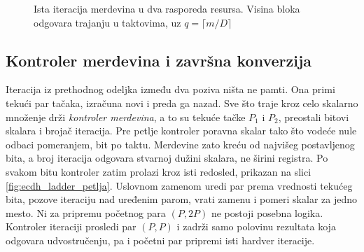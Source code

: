 \begin{figure}[H]
{
}
\caption[Ista iteracija merdevina u dva rasporeda resursa]{Ista iteracija merdevina u dva rasporeda resursa. Visina bloka odgovara trajanju u taktovima, uz $q = \lceil m/D \rceil$}
\label{fig:ecdh_korak_uporedo}
\end{figure}

\subsection{Kontroler merdevina i završna konverzija}
\label{subsec:hw_ecdh_ladder}

Iteracija iz prethodnog odeljka između dva poziva ništa ne pamti. Ona primi tekući par tačaka, izračuna novi i preda ga nazad. Sve što traje kroz celo skalarno množenje drži \textit{kontroler merdevina}, a to su tekuće tačke $P_1$ i $P_2$, preostali bitovi skalara i brojač iteracija.
\smallbreak
Pre petlje kontroler poravna skalar tako što vodeće nule odbaci pomeranjem, bit po taktu. Merdevine zato kreću od najvišeg postavljenog bita, a broj iteracija odgovara stvarnoj dužini skalara, ne širini registra. Po svakom bitu kontroler zatim prolazi kroz isti redosled, prikazan na slici \ref{fig:ecdh_ladder_petlja}. Uslovnom zamenom uredi par prema vrednosti tekućeg bita, pozove iteraciju nad uređenim parom, vrati zamenu i pomeri skalar za jedno mesto. Ni za pripremu početnog para $(P, 2P)$ ne postoji posebna logika. Kontroler iteraciji prosledi par $(P, P)$ i zadrži samo polovinu rezultata koja odgovara udvostručenju, pa i početni par pripremi isti hardver iteracije.

